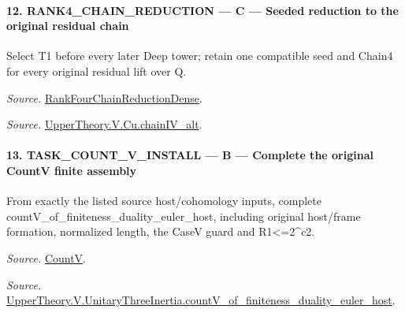 \paragraph{12. RANK4\_\allowbreak CHAIN\_\allowbreak REDUCTION — C — Seeded reduction to the original residual chain}

Select T1 before every later Deep tower; retain one compatible seed and Chain4 for every original residual lift over Q.

\emph{Source.} \href{https://github.com/CocoSgt/riemann-hypothesis-lean/blob/7cbf7a0c32fca1badf05931879a37c3f8a2b03b4/src/Development/AutomorphicArithmetic/AutomorphicVarieties/ModularityArgument/ThresholdArguments/DenseThresholdCases/PromodularityCaseThree.lean#L33-L39}{RankFourChainReductionDense}.

\emph{Source.} \href{https://github.com/CocoSgt/riemann-hypothesis-lean/blob/7cbf7a0c32fca1badf05931879a37c3f8a2b03b4/src/Development/AutomorphicArithmetic/AutomorphicVarieties/ModularityArgument/ThresholdArguments/DenseThresholdCases/CuPChainIV.lean#L16-L82}{UpperTheory.V.Cu.chainIV\_\allowbreak alt}.



\paragraph{13. TASK\_\allowbreak COUNT\_\allowbreak V\_\allowbreak INSTALL — B — Complete the original CountV finite assembly}

From exactly the listed source host/cohomology inputs, complete countV\_\allowbreak of\_\allowbreak finiteness\_\allowbreak duality\_\allowbreak euler\_\allowbreak host, including original host/frame formation, normalized length, the CaseV guard and R1<=2\textasciicircum{}c2.

\emph{Source.} \href{https://github.com/CocoSgt/riemann-hypothesis-lean/blob/7cbf7a0c32fca1badf05931879a37c3f8a2b03b4/src/Development/AutomorphicArithmetic/AutomorphicVarieties/HeightAndVanishing/Counts.lean#L69-L69}{CountV}.

\emph{Source.} \href{https://github.com/CocoSgt/riemann-hypothesis-lean/blob/7cbf7a0c32fca1badf05931879a37c3f8a2b03b4/src/Development/AutomorphicArithmetic/AutomorphicVarieties/ModularityArgument/ThresholdArguments/DenseThresholdCases/CountVOf.lean#L33-L60}{UpperTheory.V.UnitaryThreeInertia.countV\_\allowbreak of\_\allowbreak finiteness\_\allowbreak duality\_\allowbreak euler\_\allowbreak host}.



